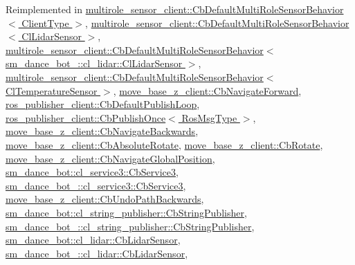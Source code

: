 Reimplemented in \hyperlink{classmultirole__sensor__client_1_1CbDefaultMultiRoleSensorBehavior_aa9241e84a1002547336a8754b7dd2d26}{multirole\+\_\+sensor\+\_\+client\+::\+Cb\+Default\+Multi\+Role\+Sensor\+Behavior$<$ Client\+Type $>$}, \hyperlink{classmultirole__sensor__client_1_1CbDefaultMultiRoleSensorBehavior_aa9241e84a1002547336a8754b7dd2d26}{multirole\+\_\+sensor\+\_\+client\+::\+Cb\+Default\+Multi\+Role\+Sensor\+Behavior$<$ Cl\+Lidar\+Sensor $>$}, \hyperlink{classmultirole__sensor__client_1_1CbDefaultMultiRoleSensorBehavior_aa9241e84a1002547336a8754b7dd2d26}{multirole\+\_\+sensor\+\_\+client\+::\+Cb\+Default\+Multi\+Role\+Sensor\+Behavior$<$ sm\+\_\+dance\+\_\+bot\+\_\+::cl\+\_\+lidar\+::\+Cl\+Lidar\+Sensor $>$}, \hyperlink{classmultirole__sensor__client_1_1CbDefaultMultiRoleSensorBehavior_aa9241e84a1002547336a8754b7dd2d26}{multirole\+\_\+sensor\+\_\+client\+::\+Cb\+Default\+Multi\+Role\+Sensor\+Behavior$<$ Cl\+Temperature\+Sensor $>$}, \hyperlink{classmove__base__z__client_1_1CbNavigateForward_ab167238d60578809027d4649a4eea536}{move\+\_\+base\+\_\+z\+\_\+client\+::\+Cb\+Navigate\+Forward}, \hyperlink{classros__publisher__client_1_1CbDefaultPublishLoop_ada860aab5d8887e8671a6ae7f4b22e76}{ros\+\_\+publisher\+\_\+client\+::\+Cb\+Default\+Publish\+Loop}, \hyperlink{classros__publisher__client_1_1CbPublishOnce_a223cb50cd7e4041d42106eb600575bae}{ros\+\_\+publisher\+\_\+client\+::\+Cb\+Publish\+Once$<$ Ros\+Msg\+Type $>$}, \hyperlink{classmove__base__z__client_1_1CbNavigateBackwards_a0338ce2154851a817642a698650b3d8d}{move\+\_\+base\+\_\+z\+\_\+client\+::\+Cb\+Navigate\+Backwards}, \hyperlink{classmove__base__z__client_1_1CbAbsoluteRotate_ab5537a52d9ddb242be60e6f9e0b231af}{move\+\_\+base\+\_\+z\+\_\+client\+::\+Cb\+Absolute\+Rotate}, \hyperlink{classmove__base__z__client_1_1CbRotate_a1528192ce89f2c1cbd9deffafecefb69}{move\+\_\+base\+\_\+z\+\_\+client\+::\+Cb\+Rotate}, \hyperlink{classmove__base__z__client_1_1CbNavigateGlobalPosition_a79f11334456f350b488f7d9a204ea3c5}{move\+\_\+base\+\_\+z\+\_\+client\+::\+Cb\+Navigate\+Global\+Position}, \hyperlink{classsm__dance__bot_1_1cl__service3_1_1CbService3_ae9e3796b507ad96cc0890fec0f64a4b7}{sm\+\_\+dance\+\_\+bot\+::cl\+\_\+service3\+::\+Cb\+Service3}, \hyperlink{classsm__dance__bot__3_1_1cl__service3_1_1CbService3_a2843cf1c653e92eda5f0305c53e8ddc5}{sm\+\_\+dance\+\_\+bot\+\_\+::cl\+\_\+service3\+::\+Cb\+Service3}, \hyperlink{classmove__base__z__client_1_1CbUndoPathBackwards_a2793c69857aa97337d56ff79dee20508}{move\+\_\+base\+\_\+z\+\_\+client\+::\+Cb\+Undo\+Path\+Backwards}, \hyperlink{classsm__dance__bot_1_1cl__string__publisher_1_1CbStringPublisher_a7aa533578e820ee90d92d15b85d42e9b}{sm\+\_\+dance\+\_\+bot\+::cl\+\_\+string\+\_\+publisher\+::\+Cb\+String\+Publisher}, \hyperlink{classsm__dance__bot__3_1_1cl__string__publisher_1_1CbStringPublisher_a4e4621380a2e055f746e6fdae5637731}{sm\+\_\+dance\+\_\+bot\+\_\+::cl\+\_\+string\+\_\+publisher\+::\+Cb\+String\+Publisher}, \hyperlink{structsm__dance__bot_1_1cl__lidar_1_1CbLidarSensor_aad3468a6ae78999c9fd01bdb81b42a49}{sm\+\_\+dance\+\_\+bot\+::cl\+\_\+lidar\+::\+Cb\+Lidar\+Sensor}, \hyperlink{structsm__dance__bot__3_1_1cl__lidar_1_1CbLidarSensor_a2e78e6e6bf6badea88778ac8a59479ec}{sm\+\_\+dance\+\_\+bot\+\_\+::cl\+\_\+lidar\+::\+Cb\+Lidar\+Sensor}, 